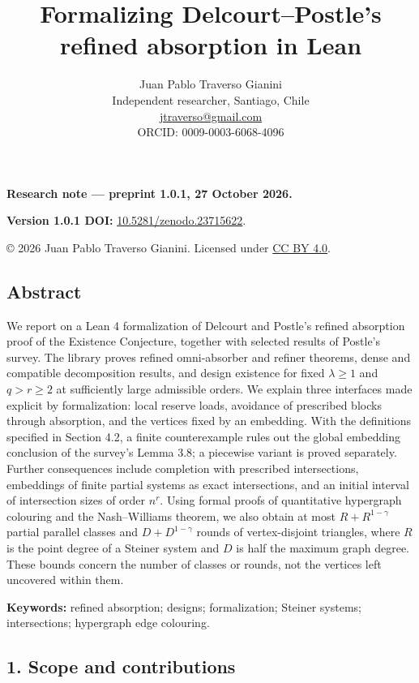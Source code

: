 \documentclass[english,11pt,a4paper]{article}
\title{Formalizing Delcourt–Postle’s refined absorption in Lean}
\author{Juan Pablo Traverso Gianini\\
\small Independent researcher, Santiago, Chile\\
\small \href{mailto:jtraverso@gmail.com}{jtraverso@gmail.com}\\
\small ORCID: 0009-0003-6068-4096}
\date{}
\begin{document}
\raggedbottom
{}
\makeatletter
{}
\makeatother
\maketitle
\textbf{Research note --- preprint 1.0.1, 27 October 2026.}

\textbf{Version 1.0.1 DOI:} \href{https://doi.org/10.5281/zenodo.23715622}{10.5281/zenodo.23715622}.

© 2026 Juan Pablo Traverso Gianini. Licensed under \href{https://creativecommons.org/licenses/by/4.0/}{CC BY 4.0}.

\subsection{Abstract}\label{abstract}

We report on a Lean 4 formalization of Delcourt and Postle's refined absorption proof of the Existence Conjecture, together with selected results of Postle's survey. The library proves refined omni-absorber and refiner theorems, dense and compatible decomposition results, and design existence for fixed \(\lambda\ge1\) and \(q>r\ge2\) at sufficiently large admissible orders. We explain three interfaces made explicit by formalization: local reserve loads, avoidance of prescribed blocks through absorption, and the vertices fixed by an embedding. With the definitions specified in Section 4.2, a finite counterexample rules out the global embedding conclusion of the survey's Lemma 3.8; a piecewise variant is proved separately. Further consequences include completion with prescribed intersections, embeddings of finite partial systems as exact intersections, and an initial interval of intersection sizes of order \(n^r\). Using formal proofs of quantitative hypergraph colouring and the Nash--Williams theorem, we also obtain at most \(R+R^{1-\gamma}\) partial parallel classes and \(D+D^{1-\gamma}\) rounds of vertex-disjoint triangles, where \(R\) is the point degree of a Steiner system and \(D\) is half the maximum graph degree. These bounds concern the number of classes or rounds, not the vertices left uncovered within them.

\textbf{Keywords:} refined absorption; designs; formalization; Steiner systems; intersections; hypergraph edge colouring.

\subsection{1. Scope and contributions}\label{scope-and-contributions}
\end{document}
